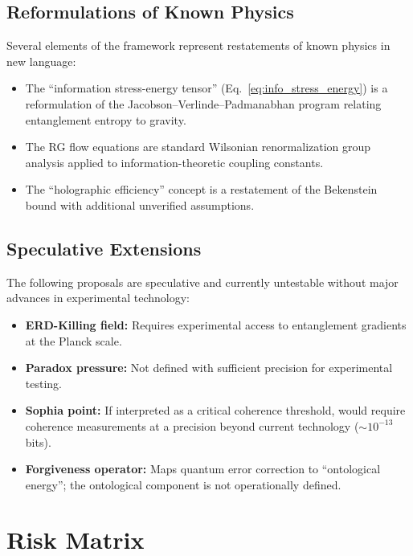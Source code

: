 \documentclass[11pt,a4paper]{article}
\begin{document}
\subsection{Reformulations of Known Physics}

Several elements of the framework represent restatements of known physics in new language:

\begin{itemize}[leftmargin=1.5em]
  \item The ``information stress-energy tensor'' (Eq.~\ref{eq:info_stress_energy}) is a reformulation of the Jacobson--Verlinde--Padmanabhan program relating entanglement entropy to gravity.
  \item The RG flow equations are standard Wilsonian renormalization group analysis applied to information-theoretic coupling constants.
  \item The ``holographic efficiency'' concept is a restatement of the Bekenstein bound with additional unverified assumptions.
\end{itemize}

\subsection{Speculative Extensions}

The following proposals are speculative and currently untestable without major advances in experimental technology:

\begin{itemize}[leftmargin=1.5em]
  \item \textbf{ERD-Killing field:} Requires experimental access to entanglement gradients at the Planck scale.
  \item \textbf{Paradox pressure:} Not defined with sufficient precision for experimental testing.
  \item \textbf{Sophia point:} If interpreted as a critical coherence threshold, would require coherence measurements at a precision beyond current technology ($\sim 10^{-13}$ bits).
  \item \textbf{Forgiveness operator:} Maps quantum error correction to ``ontological energy''; the ontological component is not operationally defined.
\end{itemize}

\section{Risk Matrix}
\end{document}
